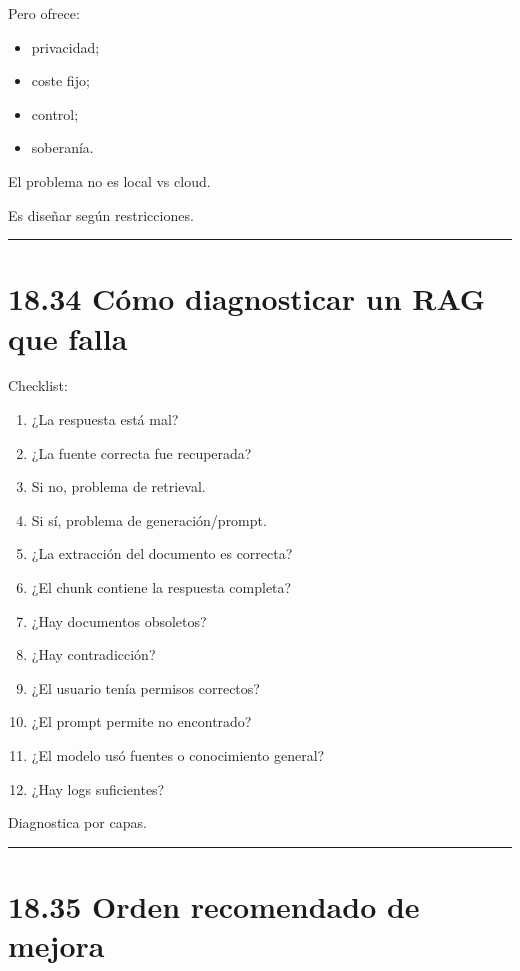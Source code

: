 Pero ofrece:

\begin{itemize}
\tightlist
\item
  privacidad;
\item
  coste fijo;
\item
  control;
\item
  soberanía.
\end{itemize}

El problema no es local vs cloud.

Es diseñar según restricciones.

\begin{center}\rule{0.5\linewidth}{0.5pt}\end{center}

\section{18.34 Cómo diagnosticar un RAG que
falla}\label{cuxf3mo-diagnosticar-un-rag-que-falla}

Checklist:

\begin{enumerate}
\def\labelenumi{\arabic{enumi}.}
\tightlist
\item
  ¿La respuesta está mal?
\item
  ¿La fuente correcta fue recuperada?
\item
  Si no, problema de retrieval.
\item
  Si sí, problema de generación/prompt.
\item
  ¿La extracción del documento es correcta?
\item
  ¿El chunk contiene la respuesta completa?
\item
  ¿Hay documentos obsoletos?
\item
  ¿Hay contradicción?
\item
  ¿El usuario tenía permisos correctos?
\item
  ¿El prompt permite no encontrado?
\item
  ¿El modelo usó fuentes o conocimiento general?
\item
  ¿Hay logs suficientes?
\end{enumerate}

Diagnostica por capas.

\begin{center}\rule{0.5\linewidth}{0.5pt}\end{center}

\section{18.35 Orden recomendado de
mejora}\label{orden-recomendado-de-mejora}

